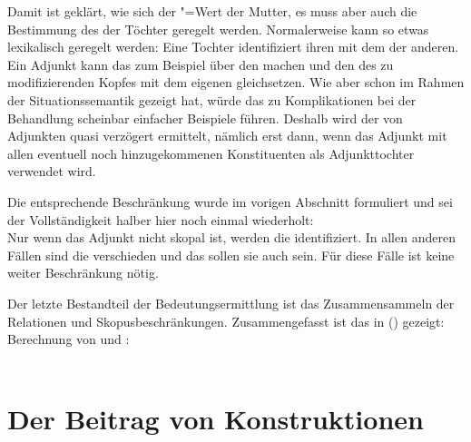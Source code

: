 
Damit ist geklärt, wie sich der \ltop"=Wert der Mutter, es muss aber auch die Bestimmung des
\ltopwes der Töchter geregelt werden. Normalerweise kann so etwas lexikalisch geregelt werden: Eine
Tochter identifiziert ihren \ltopw mit dem der anderen. Ein Adjunkt kann das zum Beispiel über
den \modw machen und den \ltopw des zu modifizierenden Kopfes mit dem eigenen gleichsetzen. Wie
\citet{Kasper97a} aber schon im Rahmen der Situationssemantik gezeigt hat, würde das zu
Komplikationen bei der Behandlung scheinbar einfacher Beispiele führen. Deshalb wird der \ltopw von
Adjunkten quasi verzögert ermittelt, nämlich erst dann, wenn das Adjunkt mit allen eventuell noch
hinzugekommenen Konstituenten als Adjunkttochter verwendet wird.

Die entsprechende Beschränkung wurde im vorigen Abschnitt formuliert und sei der Vollständigkeit
halber hier noch einmal wiederholt:
\ea
\label{ex-scopal-ltop2}\label{Semantikprinzip-nicht-skopaleTochter-LTOP}
 \impl\\[2mm]
\hfill 
{}
\z
Nur wenn das Adjunkt nicht skopal ist, werden die \ltopwe identifiziert. In allen anderen Fällen
sind die \ltopwe verschieden und das sollen sie auch sein. Für diese Fälle ist keine weiter
Beschränkung nötig.

Der letzte Bestandteil der Bedeutungsermittlung ist das Zusammensammeln der Relationen und
Skopusbeschränkungen. Zusammengefasst ist das in () gezeigt:
\ea
Berechnung von \rels und \hcons:\\
 \impl\\
\z




%


\section{Der Beitrag von Konstruktionen}

